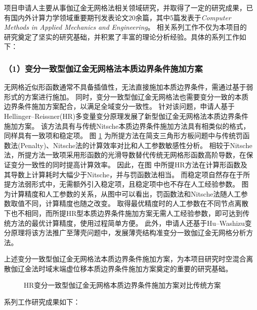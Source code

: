 

项目申请人主要从事伽辽金无网格法相关领域研究，并取得了一定的研究成果，已有国内外计算力学领域重要期刊发表论文20余篇，其中5篇发表于\textit{Computer Methods in Applied Mechanics and Engineering}。
相关系列工作不仅为本项目的研究奠定了坚实的研究基础，并积累了丰富的理论分析经验。具体的系列工作如下：

\subsubsection*{\bfseries （1）变分一致型伽辽金无网格法本质边界条件施加方案}
无网格近似形函数通常不具备插值性，无法直接施加本质边界条件，需通过基于弱形式的方案进行施加。
同时，变分一致型伽辽金无网格法也需要变分一致的本质边界条件施加方案配合，️以满足全域变分一致性。
针对该问题，申请人基于Hellinger--Reissner(HR)多变量变分原理发展了新型伽辽金无网格法本质边界条件施加方案。
该方法具有与传统Nitsche本质边界条件施加方法具有相类似的格式，同样具有一致项和稳定项。
图 \ref{fg:plate} 为所提方法在简支三角形方板问题中与传统罚函数法(Penalty)、Nitsche法的计算效率对比和人工参数敏感性分析。
相较于Nitsche法，所提方法一致项采用形函数的光滑导数替代传统无网格形函数高阶导数，在保证变分一致性的同时提高计算效率。
因此，在图  中所提HR方法在计算形函数及其导数上计算耗时大幅少于Nitsche，并与罚函数法相当。
而稳定项自然存在于所提方法弱形式中，无需额外引入稳定项，且稳定项中也不存在人工经验参数。
图  为计算精度和人工参数的关系，从图中可以看出，罚函数法和Nitsche法随人工参数取值不同，计算精度也随之改变。
取得最优精度时的人工参数在不同节点离散下也不相同，而所提HR型本质边界条件施加方案无需人工经验参数，即可达到传统方法的最优计算精度，使用过程简单方便。
此外，申请人还基于Hu--Washizu变分原理将该方法推广至薄壳问题中，发展薄壳结构准变分一致伽辽金无网格分析方法。

上述变分一致型伽辽金无网格法本质边界条件施加方案，为本项目研究时空混合离散伽辽金法时域末端虚位移本质边界条件施加方案奠定的重要的研究基础。

\begin{figure}[!h]
    \centering 
    \caption{HR变分一致型伽辽金无网格本质边界条件施加方案对比传统方案}
    \label{fg:plate}
\end{figure}

系列工作研究成果如下：

